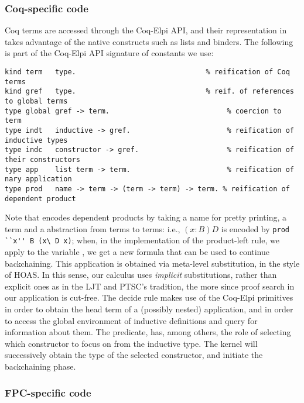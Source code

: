 \subsubsection{Coq-specific code}
Coq terms are accessed through the Coq-Elpi API, and their representation
in \lP takes advantage of the native \lP constructs such as lists and binders.
The following is part of the Coq-Elpi API signature of constants we use:
\begin{lstlisting}[language=lprolog]
kind term   type.                               % reification of Coq terms
kind gref   type.                               % reif. of references to global terms
type global gref -> term.                            % coercion to term
type indt   inductive -> gref.                       % reification of inductive types
type indc   constructor -> gref.                     % reification of their constructors 
type app    list term -> term.                       % reification of nary application
type prod   name -> term -> (term -> term) -> term. % reification of dependent product
\end{lstlisting}
%
Note that  encodes dependent products by taking a name for pretty
printing, a term and a \lP abstraction from terms to terms: i.e., $(x :
B) D$ is encoded by \verb|prod ``x'' B (x\ D x)|; when, in the
implementation of the product-left rule, we apply  to the variable
, we get a new formula that can be used to continue backchaining. This
application is obtained via meta-level substitution, in the style of HOAS. In
this sense, our calculus uses \emph{implicit} substitutions, rather than
explicit ones as in the  LJT and PTSC's tradition, the more since proof search in
our application is cut-free.
The decide rule makes use of the Coq-Elpi primitives
 in order to obtain the head term of a (possibly
nested) application, and  in order to access the global
environment of inductive definitions and query for information about them.
The  predicate,  has, among others, the role of selecting which
constructor to focus on from the inductive type. The kernel will successively
obtain the type of the selected constructor, and initiate the backchaining
phase.

\subsubsection{FPC-specific code}
\label{ssec:fpc}

